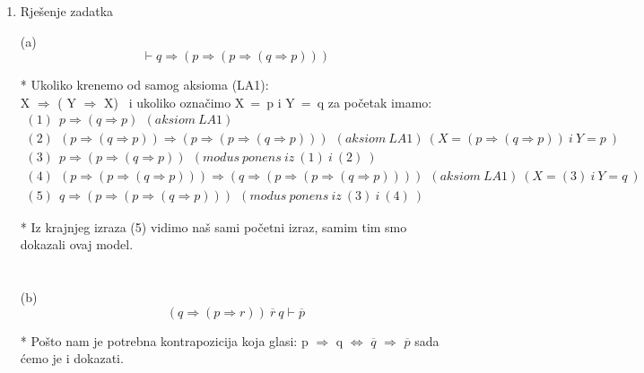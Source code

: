 \documentclass[12pt]{article}
\begin{document}
    
	\begin{enumerate}
		\item Rješenje zadatka
		
		(a) \begin{equation*}
		    \vdash q \Rightarrow ( p \Rightarrow ( p \Rightarrow ( q \Rightarrow p )))
		    \end{equation*}
		
		    * Ukoliko krenemo od samog aksioma (LA1): \\   
		    X {$\Rightarrow$} ( Y {$\Rightarrow$} X)~ i ukoliko označimo X~=~p i Y~=~q za početak imamo:  
		    \begin{align*}
		    
		        (1)~~ p \Rightarrow (q \Rightarrow p) ~~ (aksiom~LA1) \\
		        
		        (2)~~ (p \Rightarrow (q \Rightarrow p)) \Rightarrow (p \Rightarrow ( p \Rightarrow ( q \Rightarrow p))) ~~ (aksiom~LA1)~(X = (p \Rightarrow (q \Rightarrow p))~ i ~ Y = p~) \\
		        
		        (3)~~ p \Rightarrow ( p \Rightarrow ( q \Rightarrow p)) ~~(modus~ponens~iz~(1)~i~(2)~) \\
		        
		        (4)~~ (p \Rightarrow ( p \Rightarrow ( q \Rightarrow p))) \Rightarrow ( q \Rightarrow (p \Rightarrow ( p \Rightarrow ( q \Rightarrow p)))) ~~ (aksiom~LA1)~(X = (3)~ i ~ Y = q~) \\
		        
		        (5)~~ q \Rightarrow (p \Rightarrow ( p \Rightarrow ( q \Rightarrow p))) ~~(modus~ponens~iz~(3)~i~(4)~) 
		    \end{align*}
		    
		    * Iz krajnjeg izraza (5) vidimo naš sami početni izraz, samim tim smo dokazali ovaj model. \\
		    
		    
		    \\
		    
		    \\
		    
		    
		    
	    (b) \begin{equation*}
	        (q \Rightarrow ( p \Rightarrow r))~\overline{r}~q \vdash \overline{p}
	    \end{equation*}
	    
	    * Pošto nam je potrebna kontrapozicija koja glasi: p {$\Rightarrow$} q {$\Leftrightarrow$} 
	    {$\overline{q}$} {$\Rightarrow$} {$\overline{p}$} sada ćemo je i dokazati. 
	    

\end{enumerate}
\end{document}
